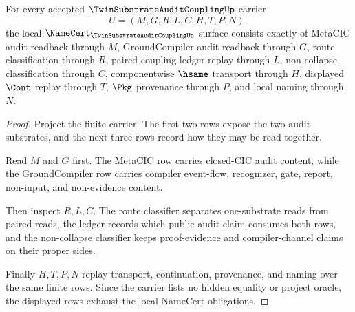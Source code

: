 \begin{theorem}
\label{thm:twin-substrate-audit-coupling-namecert-obligations}
For every accepted $\TwinSubstrateAuditCouplingUp$ carrier
$$
U=(M,G,R,L,C,H,T,P,N),
$$
the local $\NameCert_{\TwinSubstrateAuditCouplingUp}$ surface consists exactly of MetaCIC audit readback through $M$, GroundCompiler audit readback through $G$, route classification through $R$, paired coupling-ledger replay through $L$, non-collapse classification through $C$, componentwise $\hsame$ transport through $H$, displayed $\Cont$ replay through $T$, $\Pkg$ provenance through $P$, and local naming through $N$.
\end{theorem}
\begin{proof}
Project the finite carrier. The first two rows expose the two audit substrates, and the next three rows record how they may be read together.

Read $M$ and $G$ first. The MetaCIC row carries closed-CIC audit content, while the GroundCompiler row carries compiler event-flow, recognizer, gate, report, non-input, and non-evidence content.

Then inspect $R,L,C$. The route classifier separates one-substrate reads from paired reads, the ledger records which public audit claim consumes both rows, and the non-collapse classifier keeps proof-evidence and compiler-channel claims on their proper sides.

Finally $H,T,P,N$ replay transport, continuation, provenance, and naming over the same finite rows. Since the carrier lists no hidden equality or project oracle, the displayed rows exhaust the local NameCert obligations.
\end{proof}

